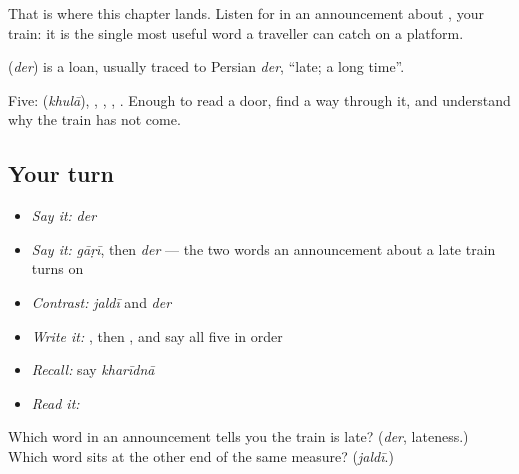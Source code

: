 That is where this chapter lands. Listen for \textbf{} in an announcement about \textbf{}, your train: it is the single most useful word a traveller can catch on a platform.

\begin{cousinweb}
\textbf{} (\emph{der}) is a loan, usually traced to Persian \emph{der}, \textquotedblleft{}late; a long time\textquotedblright{}.
\end{cousinweb}

\begin{grammarlens}[title={What you've built}]
Five: \textbf{} (\emph{khulā}), , , , . Enough to read a door, find a way through it, and understand why the train has not come.
\end{grammarlens}

\subsection*{Your turn}
\begin{itemize}
\raggedright
  \item \emph{Say it:} \emph{der}
  \item \emph{Say it:} \emph{gāṛī}, then \emph{der} — the two words an announcement about a late train turns on
  \item \emph{Contrast:} \emph{jaldī} and \emph{der}
  \item \emph{Write it:} , then , and say all five in order
  \item \emph{Recall:} say \emph{kharīdnā}
  \item \emph{Read it:} \textbf{}
\end{itemize}

\begin{tcolorbox}[breakable,colback=teal!4,colframe=teal!35!black,title={Before you move on}]
Which word in an announcement tells you the train is late? (\emph{der}, lateness.) Which word sits at the other end of the same measure? (\emph{jaldī}.)
\end{tcolorbox}
